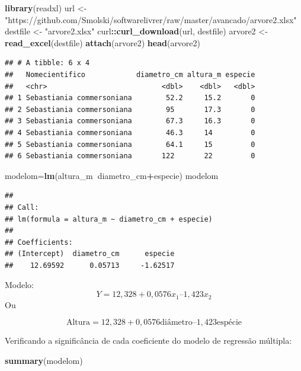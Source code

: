 \documentclass[12pt,brazil,]{book}
\newenvironment{Shaded}{\begin{snugshade}}{\end{snugshade}}
\newcommand{\KeywordTok}[1]{\textcolor[rgb]{0.13,0.29,0.53}{\textbf{#1}}}
\newcommand{\NormalTok}[1]{#1}
\newcommand{\OperatorTok}[1]{\textcolor[rgb]{0.81,0.36,0.00}{\textbf{#1}}}
\newcommand{\StringTok}[1]{\textcolor[rgb]{0.31,0.60,0.02}{#1}}
\begin{document}
\begin{Shaded}
\begin{Highlighting}[]
\KeywordTok{library}\NormalTok{(readxl)}
\NormalTok{url <-}\StringTok{ "https://github.com/Smolski/softwarelivrer/raw/master/avancado/arvore2.xlsx"}
\NormalTok{destfile <-}\StringTok{ "arvore2.xlsx"}
\NormalTok{curl}\OperatorTok{::}\KeywordTok{curl_download}\NormalTok{(url, destfile)}
\NormalTok{arvore2 <-}\StringTok{ }\KeywordTok{read_excel}\NormalTok{(destfile)}
\KeywordTok{attach}\NormalTok{(arvore2)}
\KeywordTok{head}\NormalTok{(arvore2)}
\end{Highlighting}
\end{Shaded}

\begin{verbatim}
## # A tibble: 6 x 4
##   Nomecientifico            diametro_cm altura_m especie
##   <chr>                           <dbl>    <dbl>   <dbl>
## 1 Sebastiania commersoniana        52.2     15.2       0
## 2 Sebastiania commersoniana        95       17.3       0
## 3 Sebastiania commersoniana        67.3     16.3       0
## 4 Sebastiania commersoniana        46.3     14         0
## 5 Sebastiania commersoniana        64.1     15         0
## 6 Sebastiania commersoniana       122       22         0
\end{verbatim}

\begin{Shaded}
\begin{Highlighting}[]
\NormalTok{modelom=}\KeywordTok{lm}\NormalTok{(altura_m}\OperatorTok{~}\NormalTok{diametro_cm}\OperatorTok{+}\NormalTok{especie) }
\NormalTok{modelom}
\end{Highlighting}
\end{Shaded}

\begin{verbatim}
## 
## Call:
## lm(formula = altura_m ~ diametro_cm + especie)
## 
## Coefficients:
## (Intercept)  diametro_cm      especie  
##    12.69592      0.05713     -1.62517
\end{verbatim}

Modelo: \[
Y = 12,328 + 0,0576 x_1 – 1,423 x_2
\] Ou

\[
\text{Altura} = 12,328 + 0,0576\text{diâmetro} – 1,423\text{espécie}
\]

Verificando a significância de cada coeficiente do modelo de regressão
múltipla:

\begin{Shaded}
\begin{Highlighting}[]
\KeywordTok{summary}\NormalTok{(modelom)}
\end{Highlighting}
\end{Shaded}
\end{document}
